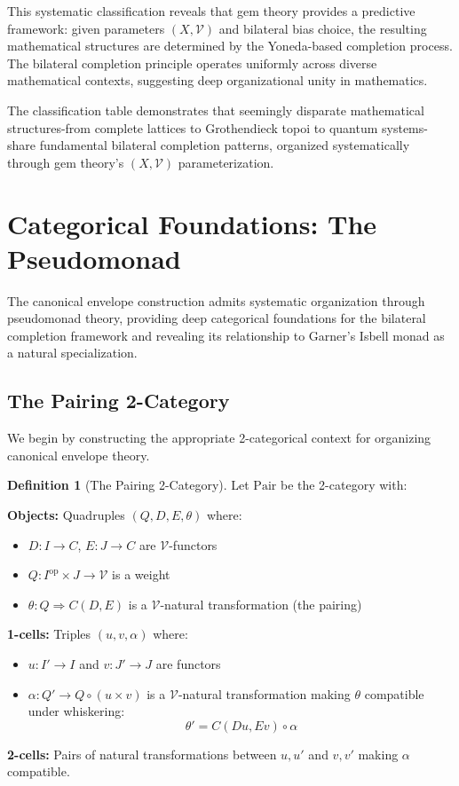 \documentclass[11pt]{article}
\theoremstyle{plain}
\theoremstyle{definition}
\newtheorem{definition}[theorem]{Definition}
\theoremstyle{remark}
\newcommand{\V}{\mathcal{V}}
\newcommand{\op}{\mathrm{op}}
\newcommand{\Pair}{\mathrm{Pair}}
\begin{document}
This systematic classification reveals that gem theory provides a predictive framework: given parameters $(X, \V)$ and bilateral bias choice, the resulting mathematical structures are determined by the Yoneda-based completion process. The bilateral completion principle operates uniformly across diverse mathematical contexts, suggesting deep organizational unity in mathematics.

The classification table demonstrates that seemingly disparate mathematical structures-from complete lattices to Grothendieck topoi to quantum systems-share fundamental bilateral completion patterns, organized systematically through gem theory's $(X, \V)$ parameterization.

\section{Categorical Foundations: The Pseudomonad}

The canonical envelope construction admits systematic organization through pseudomonad theory, providing deep categorical foundations for the bilateral completion framework and revealing its relationship to Garner's Isbell monad \cite{garner2018isbell} as a natural specialization.

\subsection{The Pairing 2-Category}

We begin by constructing the appropriate 2-categorical context for organizing canonical envelope theory.

\begin{definition}[The Pairing 2-Category]
Let $\Pair$ be the 2-category with:

\textbf{Objects:} Quadruples $(Q, D, E, \theta)$ where:
\begin{itemize}
\item $D : I \to C$, $E : J \to C$ are $\V$-functors
\item $Q : I^{\op} \times J \to \V$ is a weight  
\item $\theta : Q \Rightarrow C(D, E)$ is a $\V$-natural transformation (the pairing)
\end{itemize}

\textbf{1-cells:} Triples $(u, v, \alpha)$ where:
\begin{itemize}
\item $u : I' \to I$ and $v : J' \to J$ are functors
\item $\alpha : Q' \to Q \circ (u \times v)$ is a $\V$-natural transformation making $\theta$ compatible under whiskering:
$$
\theta' = C(Du, Ev) \circ \alpha
$$
\end{itemize}

\textbf{2-cells:} Pairs of natural transformations between $u, u'$ and $v, v'$ making $\alpha$ compatible.
\end{definition}
\end{document}
